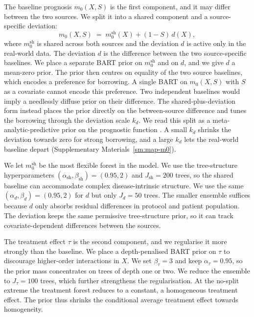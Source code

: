 The baseline prognosis $m_0(X, S)$ is the first component, and it may differ between the two sources.
We split it into a shared component and a source-specific deviation:
\begin{equation}
m_0(X, S) \;=\; m_0^{\mathrm{sh}}(X) + (1 - S)\, d(X),
\label{eq:m0-decomp-prop}
\end{equation}
where $m_0^{\mathrm{sh}}$ is shared across both sources and the deviation $d$ is active only in the real-world data.
The deviation $d$ is the difference between the two source-specific baselines.
We place a separate BART prior on $m_0^{\mathrm{sh}}$ and on $d$, and we give $d$ a mean-zero prior.
The prior then centres on equality of the two source baselines, which encodes a preference for borrowing.
A single BART on $m_0(X, S)$ with $S$ as a covariate cannot encode this preference.
Two independent baselines would imply a needlessly diffuse prior on their difference.
The shared-plus-deviation form instead places the prior directly on the between-source difference and tunes the borrowing through the deviation scale $k_d$.
We read this split as a meta-analytic-predictive prior on the prognostic function \citep{neuenschwander2010}.
A small $k_d$ shrinks the deviation towards zero for strong borrowing, and a large $k_d$ lets the real-world baseline depart (Supplementary Materials~\ref{sm:map-m0}).

We let $m_0^{\mathrm{sh}}$ be the most flexible forest in the model.
We use the tree-structure hyperparameters $(\alpha_{\mathrm{sh}}, \beta_{\mathrm{sh}}) = (0.95, 2)$ and $J_{\mathrm{sh}} = 200$ trees, so the shared baseline can accommodate complex disease-intrinsic structure.
We use the same $(\alpha_d, \beta_d) = (0.95, 2)$ for $d$ but only $J_d = 50$ trees.
The smaller ensemble suffices because $d$ only absorbs residual differences in protocol and patient population.
The deviation keeps the same permissive tree-structure prior, so it can track covariate-dependent differences between the sources.

The treatment effect $\tau$ is the second component, and we regularise it more strongly than the baseline.
We place a depth-penalised BART prior on $\tau$ to discourage higher-order interactions in $X$.
We set $\beta_\tau = 3$ and keep $\alpha_\tau = 0.95$, so the prior mass concentrates on trees of depth one or two.
We reduce the ensemble to $J_\tau = 100$ trees, which further strengthens the regularisation.
At the no-split extreme the treatment forest reduces to a constant, a homogeneous treatment effect.
The prior thus shrinks the conditional average treatment effect towards homogeneity.

